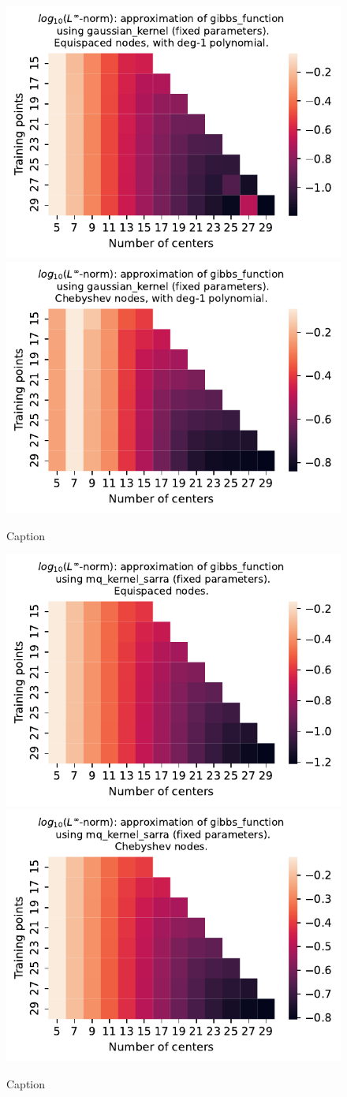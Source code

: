 \documentclass[12pt]{report} %
\begin{document}
\begin{figure}[ht]
  \centering

  \includegraphics[width=.49\textwidth]{imagenes/experiments/1d/least_squares/opt-gibbs_function-Kgaussian_kernel-Poly-Equi.pdf}
  \includegraphics[width=.49\textwidth]{imagenes/experiments/1d/least_squares/opt-gibbs_function-Kgaussian_kernel-Poly-Cheb.pdf}
  \caption{Caption}
  \label{fig:opt-gibbs-gaussian-poly}
\end{figure}

\begin{figure}[ht]
  \centering

  \includegraphics[width=.49\textwidth]{imagenes/experiments/1d/least_squares/opt-gibbs_function-Kmq_kernel_sarra-Equi.pdf}
  \includegraphics[width=.49\textwidth]{imagenes/experiments/1d/least_squares/opt-gibbs_function-Kmq_kernel_sarra-Cheb.pdf}
  \caption{Caption}
  \label{fig:opt-gibbs-sarra}
\end{figure}
\end{document}
